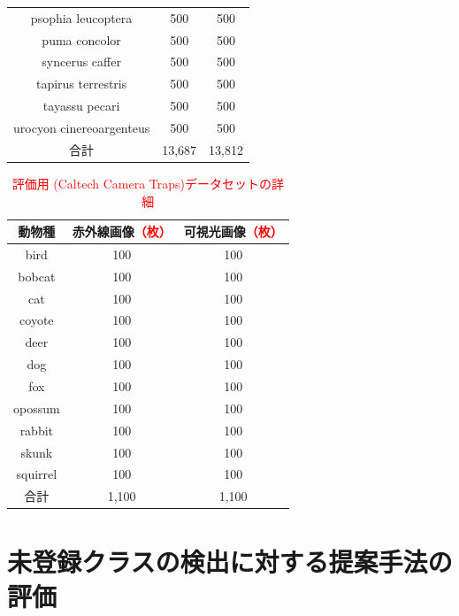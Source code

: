 \documentclass[a4paper,11pt,nomag]{jsreport}
\begin{document}
\begin{table}[tbp]
\begin{tabular}{c|c|c}
      psophia leucoptera       & 500          & 500          \\
      puma concolor            & 500          & 500          \\
      syncerus caffer          & 500          & 500          \\
      tapirus terrestris       & 500          & 500          \\
      tayassu pecari           & 500          & 500          \\
      urocyon cinereoargenteus & 500          & 500          \\ \hline\hline
      合計                      & 13,687       & 13,812       \\ \hline
  \end{tabular}
\end{table}

\begin{table}[tbp]
  \centering
  \caption{\textcolor{red}{評価用 (Caltech Camera Traps)データセットの詳細}}
  \label{tbl:cct}
  \begin{tabular}{c|c|c}
      \hline
      動物種       & 赤外線画像\textcolor{red}{（枚）} & 可視光画像\textcolor{red}{（枚）} \\ \hline\hline
      bird        & 100      & 100       \\
      bobcat      & 100      & 100       \\
      cat         & 100      & 100       \\
      coyote      & 100      & 100       \\
      deer        & 100      & 100       \\
      dog         & 100      & 100       \\
      fox         & 100      & 100       \\
      opossum     & 100      & 100       \\
      rabbit      & 100      & 100       \\
      skunk       & 100      & 100       \\
      squirrel    & 100      & 100       \\ \hline\hline
      合計         & 1,100    & 1,100     \\ \hline
  \end{tabular}
\end{table}

\section{未登録クラスの検出に対する提案手法の評価}
\label{sec:detect}
\end{document}
